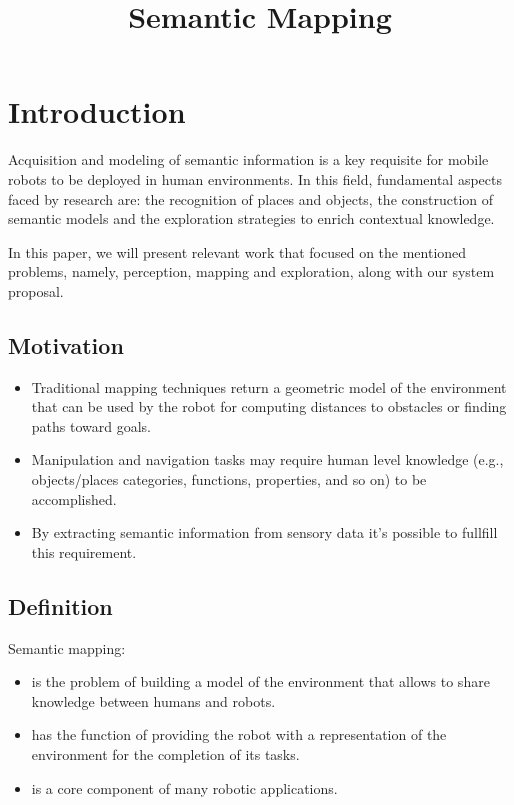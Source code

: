 \documentclass{article}
\title{\LARGE \bf Semantic Mapping}
\begin{document}
	
	\maketitle
	
	\section{Introduction}
	
	Acquisition and modeling of semantic information is a key requisite for mobile robots to be deployed in human environments. In this field, fundamental aspects faced by research are: the recognition of places and objects, the construction of semantic models and the exploration strategies to enrich contextual knowledge. 
	
	In this paper, we will present relevant work that focused on the mentioned problems, namely, perception, mapping and exploration, along with our system proposal.

	\subsection{Motivation}
	
	\begin{itemize}
		\item Traditional mapping techniques return a geometric model of the environment that can be used by the robot for computing distances to obstacles or finding paths toward goals.
		\item Manipulation and navigation tasks may require human level knowledge (e.g., objects/places categories, functions, properties, and so on) to be accomplished.
		\item By extracting semantic information from sensory data it's possible to fullfill this requirement.
	\end{itemize}
	
		
	\subsection{Definition}
		
	Semantic mapping:
		
	\begin{itemize}
		\item is the problem of building a model of the environment that allows to share knowledge between humans and robots.
		\item has the function of providing the robot with a representation of the environment for the completion of its tasks.
		\item is a core component of many robotic applications.
	\end{itemize}
		
\end{document}
